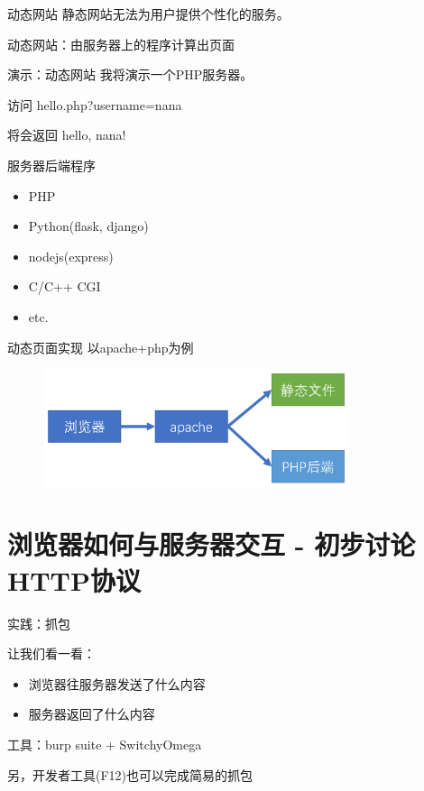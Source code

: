 \documentclass[UTF8]{ctexbeamer}
\begin{document}
\begin{frame}{动态网站}
    静态网站无法为用户提供个性化的服务。

    \vspace{2em}

    动态网站：由服务器上的程序计算出页面

\end{frame}

\begin{frame}{演示：动态网站}
    我将演示一个PHP服务器。
    
    访问 hello.php?username=nana
    
    将会返回 hello, nana!
    
\end{frame}

\begin{frame}{服务器后端程序}
    \begin{itemize}
        \item PHP
        \item Python(flask, django)
        \item nodejs(express)
        \item C/C++ CGI
        \item etc.
    \end{itemize}
\end{frame}
\begin{frame}{动态页面实现}
    以apache+php为例
    
    \begin{figure}
        \centering
        \includegraphics[width=0.8\textwidth]{dynamic.png}
    \end{figure}
\end{frame}

\section{浏览器如何与服务器交互 - 初步讨论HTTP协议}

\begin{frame}{实践：抓包}
    
    让我们看一看：
    
    \begin{itemize}
        \item 浏览器往服务器发送了什么内容
        \item 服务器返回了什么内容
    \end{itemize}
    
    工具：burp suite + SwitchyOmega
    
    另，开发者工具(F12)也可以完成简易的抓包

\end{frame}
\end{document}
